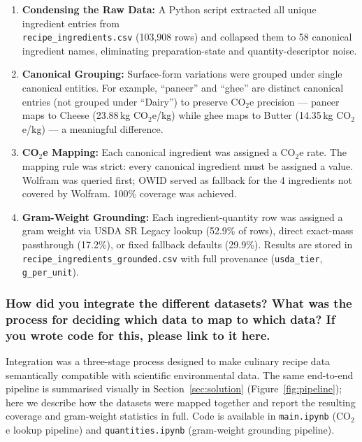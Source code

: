 \documentclass{article}
\newcommand{\question}[1]{#1}
\begin{document}
\begin{enumerate}
    \item \textbf{Condensing the Raw Data:} A Python script extracted all unique ingredient entries from \\ \texttt{recipe\_ingredients.csv} (103,908 rows) and collapsed them to 58 canonical ingredient names, eliminating preparation-state and quantity-descriptor noise.
    \item \textbf{Canonical Grouping:} Surface-form variations were grouped under single canonical entities. For example, ``paneer'' and ``ghee'' are distinct canonical entries (not grouped under ``Dairy'') to preserve CO$_2$e precision --- paneer maps to Cheese (23.88\,kg CO$_2$e/kg) while ghee maps to Butter (14.35\,kg CO$_2$e/kg) --- a meaningful difference.
    \item \textbf{CO$_2$e Mapping:} Each canonical ingredient was assigned a CO$_2$e rate. The mapping rule was strict: every canonical ingredient must be assigned a value. Wolfram was queried first; OWID served as fallback for the 4 ingredients not covered by Wolfram. 100\% coverage was achieved.
    \item \textbf{Gram-Weight Grounding:} Each ingredient-quantity row was assigned a gram weight via USDA SR Legacy lookup (52.9\% of rows), direct exact-mass passthrough (17.2\%), or fixed fallback defaults (29.9\%). Results are stored in \\ \texttt{recipe\_ingredients\_grounded.csv} with full provenance (\texttt{usda\_tier}, \texttt{g\_per\_unit}).
\end{enumerate}

\question{\subsubsection*{How did you integrate the different datasets? What was the process for deciding which data to map to which data? If you wrote code for this, please link to it here.}}

Integration was a three-stage process designed to make culinary recipe data semantically compatible with scientific environmental data. The same end-to-end pipeline is summarised visually in Section~\ref{sec:solution} (Figure~\ref{fig:pipeline}); here we describe how the datasets were mapped together and report the resulting coverage and gram-weight statistics in full. Code is available in \texttt{main.ipynb} (CO$_2$e lookup pipeline) and \texttt{quantities.ipynb} (gram-weight grounding pipeline).
\end{document}
